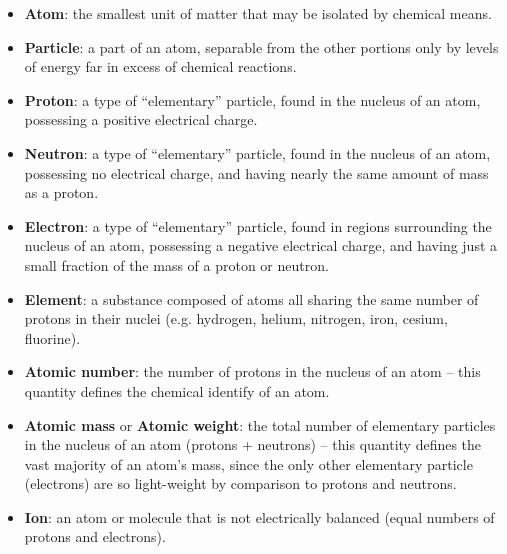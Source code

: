 \begin{itemize}
\item{} {\bf Atom}: the smallest unit of matter that may be isolated by chemical means.
\item{} {\bf Particle}: a part of an atom, separable from the other portions only by levels of energy far in excess of chemical reactions.
\item{} {\bf Proton}: a type of ``elementary'' particle, found in the nucleus of an atom, possessing a positive electrical charge.
\item{} {\bf Neutron}: a type of ``elementary'' particle, found in the nucleus of an atom, possessing no electrical charge, and having nearly the same amount of mass as a proton.
\item{} {\bf Electron}: a type of ``elementary'' particle, found in regions surrounding the nucleus of an atom, possessing a negative electrical charge, and having just a small fraction of the mass of a proton or neutron. 
\item{} {\bf Element}: a substance composed of atoms all sharing the same number of protons in their nuclei (e.g. hydrogen, helium, nitrogen, iron, cesium, fluorine). 
\item{} {\bf Atomic number}: the number of protons in the nucleus of an atom -- this quantity defines the chemical identify of an atom.  
\item{} {\bf Atomic mass} or {\bf Atomic weight}: the total number of elementary particles in the nucleus of an atom (protons + neutrons) -- this quantity defines the vast majority of an atom's mass, since the only other elementary particle (electrons) are so light-weight by comparison to protons and neutrons.  
\item{} {\bf Ion}: an atom or molecule that is not electrically balanced (equal numbers of protons and electrons). 
\begin{itemize}


\end{itemize}
\end{itemize}
